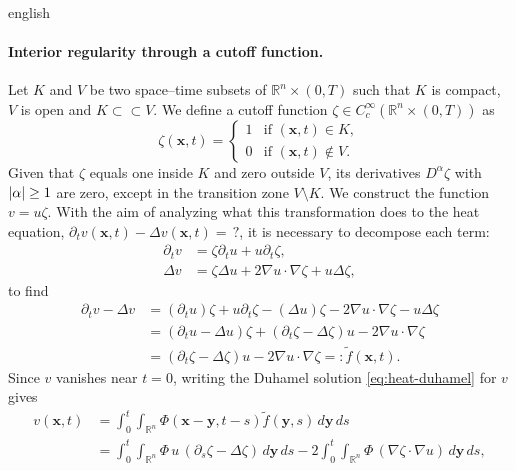 \documentclass[0000.tex]{subfiles}
\begin{document}
\begin{hyphenrules}{english}
\paragraph{Interior regularity through a cutoff function.}
Let $K$ and $V$ be two
space--time subsets of $\mathbb{R}^n\times(0,T)$ such that $K$ is compact, $V$ is open and $K\subset\subset V$.
We define a cutoff function $\zeta\in C_c^\infty(\mathbb{R}^n\times(0,T))$ as
\begin{equation}
  \zeta(\mathbf{x},t)=
  \begin{cases}
    1 & \text{if } (\mathbf{x},t)\in K,\\
    0 & \text{if } (\mathbf{x},t)\notin V.
  \end{cases}
  \label{eq:cutoff}
\end{equation}
Given that $\zeta$ equals one inside $K$ and zero outside $V$, its derivatives $D^\alpha\zeta$ with
$\left\lvert \alpha \right\rvert\ge1$ are zero, except in the transition zone $V\setminus K$. We construct the function
$v=u\zeta$. With the aim of analyzing what this transformation does to the heat equation,
$\partial_t v(\mathbf{x},t)-\Delta v(\mathbf{x},t)=\,?$, it is necessary to decompose each term:
\begin{align}
  \partial_t v&=\zeta\partial_t u+u\partial_t\zeta, \label{eq:cut-dt}\\
  \Delta v&=\zeta\Delta u+2\nabla u\cdot\nabla\zeta+u\Delta\zeta, \label{eq:cut-lap}
\end{align}
to find
\begin{align}
  \partial_t v-\Delta v
    &=(\partial_t u)\zeta+u\partial_t\zeta-(\Delta u)\zeta-2\nabla u\cdot\nabla\zeta-u\Delta\zeta \label{eq:cut-1}\\
    &=(\partial_t u-\Delta u)\zeta+(\partial_t\zeta-\Delta\zeta)u-2\nabla u\cdot\nabla\zeta \label{eq:cut-2}\\
    &=(\partial_t\zeta-\Delta\zeta)u-2\nabla u\cdot\nabla\zeta=:\tilde f(\mathbf{x},t). \label{eq:cut-3}
\end{align}
Since $v$ vanishes near $t=0$, writing the Duhamel solution \eqref{eq:heat-duhamel} for $v$ gives
\begin{align}
  v(\mathbf{x},t)&=\int_0^t\!\!\int_{\mathbb{R}^n}\Phi(\mathbf{x}-\mathbf{y},t-s)\tilde f(\mathbf{y},s)\,d\mathbf{y}\,d s \label{eq:cut-4}\\
         &=\int_0^t\!\!\int_{\mathbb{R}^n}\Phi\,u\,(\partial_s\zeta-\Delta\zeta)\,d\mathbf{y}\,d s
           -2\int_0^t\!\!\int_{\mathbb{R}^n}\Phi\,(\nabla\zeta\cdot\nabla u)\,d\mathbf{y}\,d s, \label{eq:cut-5}

\end{align}
\end{hyphenrules}
\end{document}
